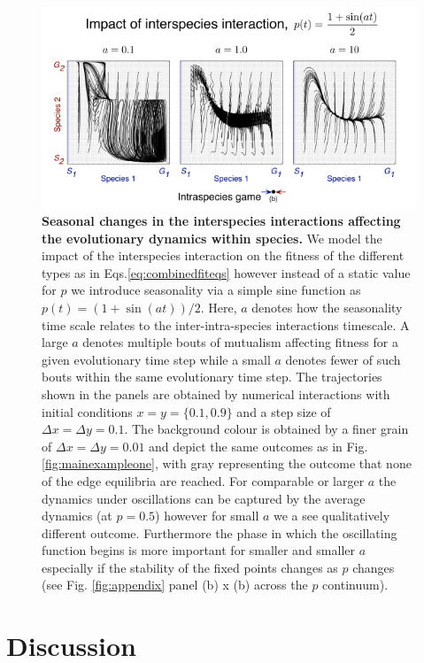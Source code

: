\documentclass[12pt]{article}
\begin{document}
\begin{figure}
\begin{center}
\includegraphics[width=\columnwidth]{../Figures/oscillating_p_reduced.pdf}
\caption{\small{
\textbf{Seasonal changes in the interspecies interactions affecting the evolutionary dynamics within species.}
We model the impact of the interspecies interaction on the fitness of the different types as in Eqs.\ref{eq:combinedfiteqs} however instead of a static value for $p$ we introduce seasonality via a simple sine function as $p(t) = (1+\sin(at))/2$.
Here, $a$ denotes how the seasonality time scale relates to the inter-intra-species interactions timescale.
A large $a$ denotes multiple bouts of mutualism affecting fitness for a given evolutionary time step while a small $a$ denotes fewer of such bouts within the same evolutionary time step.
The trajectories shown in the panels are obtained by numerical interactions with initial conditions $x = y = \{0.1,0.9\}$ and a step size of $\Delta x = \Delta y = 0.1$.
The background colour is obtained by a finer grain of $\Delta x = \Delta y = 0.01$ and depict the same outcomes as in Fig. \ref{fig:mainexampleone}, with gray representing the outcome that none of the edge equilibria are reached.
For comparable or larger $a$ the dynamics under oscillations can be captured by the average dynamics (at $p = 0.5$) however for small $a$ we a see qualitatively different outcome.
Furthermore the phase in which the oscillating function begins is more important for smaller and smaller $a$ especially if the stability of the fixed points changes as $p$ changes (see Fig. \ref{fig:appendix} panel (b) x (b) across the $p$ continuum).
 }
\label{fig:oscillations}
}
\end{center}
\end{figure}

\section{Discussion}
\end{document}
